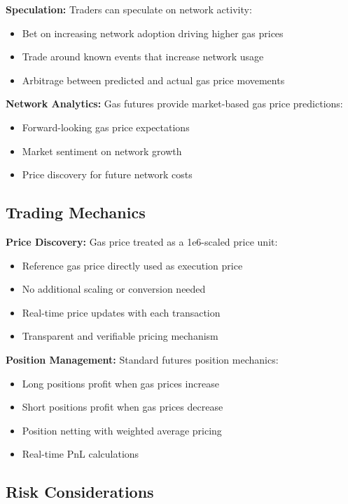 \documentclass[12pt]{article}
\begin{document}
\textbf{Speculation:} Traders can speculate on network activity:
\begin{itemize}
    \item Bet on increasing network adoption driving higher gas prices
    \item Trade around known events that increase network usage
    \item Arbitrage between predicted and actual gas price movements
\end{itemize}

\textbf{Network Analytics:} Gas futures provide market-based gas price predictions:
\begin{itemize}
    \item Forward-looking gas price expectations
    \item Market sentiment on network growth
    \item Price discovery for future network costs
\end{itemize}

\subsection{Trading Mechanics}

\textbf{Price Discovery:} Gas price treated as a 1e6-scaled price unit:
\begin{itemize}
    \item Reference gas price directly used as execution price
    \item No additional scaling or conversion needed
    \item Real-time price updates with each transaction
    \item Transparent and verifiable pricing mechanism
\end{itemize}

\textbf{Position Management:} Standard futures position mechanics:
\begin{itemize}
    \item Long positions profit when gas prices increase
    \item Short positions profit when gas prices decrease
    \item Position netting with weighted average pricing
    \item Real-time PnL calculations
\end{itemize}

\subsection{Risk Considerations}
\end{document}
